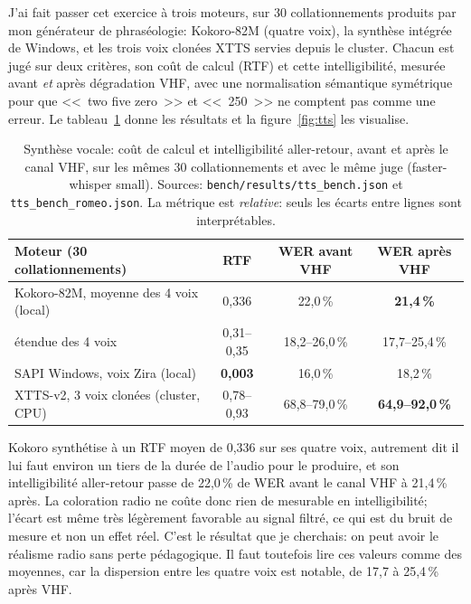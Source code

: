 \documentclass[11pt,a4paper]{article}
\begin{document}
J'ai fait passer cet exercice à trois moteurs, sur 30 collationnements produits par mon générateur de phraséologie: Kokoro-82M (quatre voix), la synthèse intégrée de Windows, et les trois voix clonées XTTS servies depuis le cluster. Chacun est jugé sur deux critères, son coût de calcul (RTF) et cette intelligibilité, mesurée avant \emph{et} après dégradation VHF, avec une normalisation sémantique symétrique pour que <<~two five zero~>> et <<~250~>> ne comptent pas comme une erreur. Le tableau~\ref{tab:tts} donne les résultats et la figure~\ref{fig:tts} les visualise.

\begin{table}[!htbp]
\centering
\caption[Synthèse vocale: coût et intelligibilité des trois moteurs]{Synthèse vocale: coût de calcul et intelligibilité aller-retour, avant et après le
canal VHF, sur les mêmes 30 collationnements et avec le même juge (faster-whisper small).
Sources: \texttt{bench/results/tts\_bench.json} et \texttt{tts\_bench\_romeo.json}. La
métrique est \emph{relative}: seuls les écarts entre lignes sont interprétables.}
\label{tab:tts}
\small
\begin{tabular}{>{\raggedright\arraybackslash}p{6.2cm} c c c}
\toprule
\rowcolor{lightgray}\textbf{Moteur (30 collationnements)} & \textbf{RTF} & \textbf{WER avant VHF} & \textbf{WER après VHF}\\
\midrule
Kokoro-82M, moyenne des 4 voix (local) & 0,336 & 22,0\,\% & \textbf{21,4\,\%}\\
\quad étendue des 4 voix & 0,31--0,35 & 18,2--26,0\,\% & 17,7--25,4\,\%\\
SAPI Windows, voix Zira (local) & \textbf{0,003} & 16,0\,\% & 18,2\,\%\\
XTTS-v2, 3 voix clonées (cluster, CPU) & 0,78--0,93 & 68,8--79,0\,\% & \textbf{64,9--92,0\,\%}\\
\bottomrule
\end{tabular}
\end{table}

Kokoro synthétise à un RTF moyen de 0,336 sur ses quatre voix, autrement dit il lui faut environ un tiers de la durée de l'audio pour le produire, et son intelligibilité aller-retour passe de 22,0\,\% de WER avant le canal VHF à 21,4\,\% après. La coloration radio ne coûte donc rien de mesurable en intelligibilité; l'écart est même très légèrement favorable au signal filtré, ce qui est du bruit de mesure et non un effet réel. C'est le résultat que je cherchais: on peut avoir le réalisme radio sans perte pédagogique. Il faut toutefois lire ces valeurs comme des moyennes, car la dispersion entre les quatre voix est notable, de 17,7 à 25,4\,\% après VHF.
\end{document}
